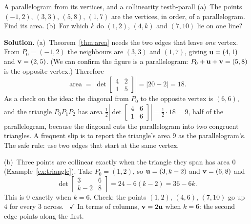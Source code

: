 \documentclass[11pt]{article}
\begin{document}
\begin{exmp}{A parallelogram from its vertices, and a collinearity test}{b-parall}
(a)~The points $(-1,2)$, $(3,3)$, $(5,8)$, $(1,7)$ are the vertices, in order, of a parallelogram. Find its area. (b)~For which $k$ do $(1,2)$, $(4,k)$ and $(7,10)$ lie on one line?

\textbf{Solution.} (a)~Theorem~\ref{thm:area} needs the two edges that leave \emph{one} vertex. From $P_0=(-1,2)$ the neighbours are $(3,3)$ and $(1,7)$, giving $\mathbf{u}=(4,1)$ and $\mathbf{v}=(2,5)$. (We can confirm the figure is a parallelogram: $P_0+\mathbf{u}+\mathbf{v}=(5,8)$ is the opposite vertex.) Therefore
\[
\operatorname{area}=\left|\det\begin{bmatrix}4&2\\1&5\end{bmatrix}\right|=|20-2|=18.
\]
As a check on the idea: the diagonal from $P_0$ to the opposite vertex is $(6,6)$, and the triangle $P_0P_1P_2$ has area $\tfrac12\left|\det\begin{bmatrix}4&6\\1&6\end{bmatrix}\right|=\tfrac12\cdot18=9$, half of the parallelogram, because the diagonal cuts the parallelogram into two congruent triangles. A frequent slip is to report the triangle's area $9$ as the parallelogram's. The safe rule: use two edges that start at the same vertex.

(b)~Three points are collinear exactly when the triangle they span has area $0$ (Example~\ref{ex:triangle}). Take $P_0=(1,2)$, so $\mathbf{u}=(3,k-2)$ and $\mathbf{v}=(6,8)$ and
\[
\det\begin{bmatrix}3&6\\k-2&8\end{bmatrix}=24-6(k-2)=36-6k .
\]
This is $0$ exactly when $k=6$. Check: the points $(1,2)$, $(4,6)$, $(7,10)$ go up $4$ for every $3$ across. \ $\checkmark$ In terms of columns, $\mathbf{v}=2\mathbf{u}$ when $k=6$: the second edge points along the first.
\end{exmp}
\end{document}

